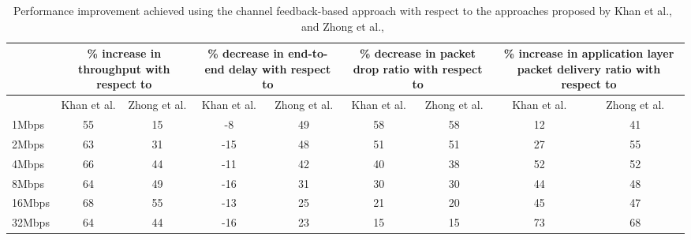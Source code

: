 \begin{table}[!htb]
	\centering
    \caption{Performance improvement achieved using the channel feedback-based approach with respect to the approaches proposed by Khan et al.,~\cite{khan2015towards} and Zhong et al.,~\cite{zhong2014capacity}}
  \label{tab:topology4ChannelImprovement}
  \renewcommand\multirowsetup{\centering}
    \begin{tabular}{|>{\centering} p{}|c|c|c|c|c|c|c|c|}
    \hline
    \multirow{2}{0.12\textwidth}{\newline \newline \newline Application data rate} & \multicolumn{2}{|p{0.12\textwidth}|}{\centering\% increase in throughput with respect to} & \multicolumn{2}{|p{0.12\textwidth}|}{\centering\% decrease in end-to-end delay with respect to} & \multicolumn{2}{|p{0.12\textwidth}|}{\centering\% decrease in packet drop ratio with respect to} & \multicolumn{2}{|p{0.16\textwidth}|}{\centering\% increase in application layer packet delivery ratio with respect to}\\
    \cline{2-9}
          & \multicolumn{1}{|p{0.06\textwidth}|}{\centering Khan et al.} & \multicolumn{1}{|p{0.06\textwidth}|}{\centering Zhong et al.} & \multicolumn{1}{|p{0.06\textwidth}|}{\centering Khan et al.} & \multicolumn{1}{|p{0.06\textwidth}|}{\centering Zhong et al.} & \multicolumn{1}{|p{0.06\textwidth}|}{\centering Khan et al.} & \multicolumn{1}{|p{0.06\textwidth}|}{\centering Zhong et al.} & \multicolumn{1}{|p{0.08\textwidth}|}{\centering Khan et al.} & \multicolumn{1}{|p{0.08\textwidth}|}{\centering Zhong et al.}\\
    \hline
    1Mbps & 55 & 15 & -8 & 49 & 58 & 58 & 12 & 41 \\\hline 
    2Mbps & 63 & 31 & -15 & 48 & 51 & 51 & 27 & 55 \\\hline 
    4Mbps & 66 & 44 & -11 & 42 & 40 & 38 & 52 & 52 \\\hline 
    8Mbps & 64 & 49 & -16 & 31 & 30 & 30 & 44 & 48\\\hline 
    16Mbps & 68 & 55 & -13 & 25 & 21 & 20 & 45 & 47 \\\hline 
    32Mbps & 64 & 44 & -16 & 23 & 15 & 15 & 73 & 68 \\\hline 
    \end{tabular}%
\end{table}

